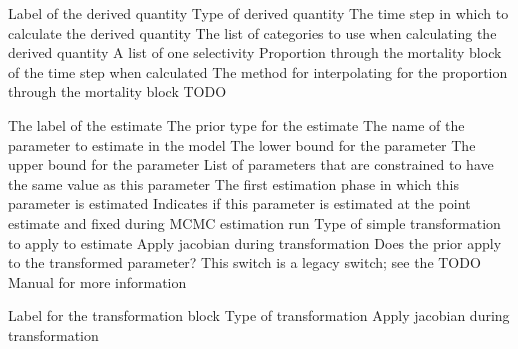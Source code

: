 \par\par
{} {Label of the derived quantity}
 {Type of derived quantity}
 {The time step in which to calculate the derived quantity}
 {The list of categories to use when calculating the derived quantity}
 {A list of one selectivity}
 {Proportion through the mortality block of the time step when calculated}
 {The method for interpolating for the proportion through the mortality block}
 {TODO}

\par\textbf{}\par
\par\textbf{}\par

\par\par
{} {The label of the estimate}
 {The prior type for the estimate}
 {The name of the parameter to estimate in the model}
 {The lower bound for the parameter}
 {The upper bound for the parameter}
 {List of parameters that are constrained to have the same value as this parameter}
 {The first estimation phase in which this parameter is estimated}
 {Indicates if this parameter is estimated at the point estimate and fixed during MCMC estimation run}
 {Type of simple transformation to apply to estimate}
 {Apply jacobian during transformation}
 {Does the prior apply to the transformed parameter? This switch is a legacy switch; see the TODO Manual for more information}

\par\par
{} {Label for the transformation block}
 {Type of transformation}
 {Apply jacobian during transformation}

